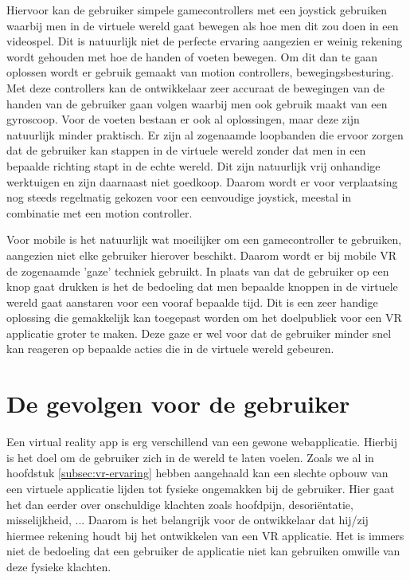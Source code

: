 Hiervoor kan de gebruiker simpele gamecontrollers met een joystick gebruiken waarbij men in de virtuele wereld gaat bewegen als hoe men dit zou doen in een videospel. Dit is natuurlijk niet de perfecte ervaring aangezien er weinig rekening wordt gehouden met hoe de handen of voeten bewegen. Om dit dan te gaan oplossen wordt er gebruik gemaakt van motion controllers, bewegingsbesturing. Met deze controllers kan de ontwikkelaar zeer accuraat de bewegingen van de handen van de gebruiker gaan volgen waarbij men ook gebruik maakt van een gyroscoop. Voor de voeten bestaan er ook al oplossingen, maar deze zijn natuurlijk minder praktisch. Er zijn al zogenaamde loopbanden die ervoor zorgen dat de gebruiker kan stappen in de virtuele wereld zonder dat men in een bepaalde richting stapt in de echte wereld. Dit zijn natuurlijk vrij onhandige werktuigen en zijn daarnaast niet goedkoop. Daarom wordt er voor verplaatsing nog steeds regelmatig gekozen voor een eenvoudige joystick, meestal in combinatie met een motion controller.

Voor mobile is het natuurlijk wat moeilijker om een gamecontroller te gebruiken, aangezien niet elke gebruiker hierover beschikt. Daarom wordt er bij mobile VR de zogenaamde 'gaze' techniek gebruikt. In plaats van dat de gebruiker op een knop gaat drukken is het de bedoeling dat men bepaalde knoppen in de virtuele wereld gaat aanstaren voor een vooraf bepaalde tijd. Dit is een zeer handige oplossing die gemakkelijk kan toegepast worden om het doelpubliek voor een VR applicatie groter te maken. Deze gaze er wel voor dat de gebruiker minder snel kan reageren op bepaalde acties die in de virtuele wereld gebeuren.

\section{De gevolgen voor de gebruiker}
\label{sec:gevolgen-vr}
Een virtual reality app is erg verschillend van een gewone webapplicatie. Hierbij is het doel om de gebruiker zich in de wereld te laten voelen. Zoals we al in hoofdstuk \ref{subsec:vr-ervaring} hebben aangehaald kan een slechte opbouw van een virtuele applicatie lijden tot fysieke ongemakken bij de gebruiker. Hier gaat het dan eerder over onschuldige klachten zoals hoofdpijn, desoriëntatie, misselijkheid, ... Daarom is het belangrijk voor de ontwikkelaar dat hij/zij hiermee rekening houdt bij het ontwikkelen van een VR applicatie. Het is immers niet de bedoeling dat een gebruiker de applicatie niet kan gebruiken omwille van deze fysieke klachten.

